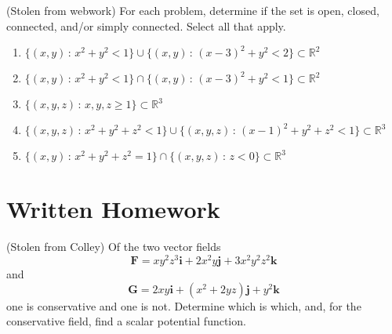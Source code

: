 \documentclass{ximera}
\begin{document}
\begin{problem}
(Stolen from webwork) For each problem, determine if the set is open, closed, connected, and/or simply connected. Select all that apply.
\begin{enumerate}
\item $\{(x,y)\,:\,x^2+y^2<1\}\cup\{(x,y)\,:\,(x-3)^2+y^2<2\}\subset \mathbb{R}^2$
\begin{selectAll}
  \end{selectAll}
\item $\{(x,y)\,:\,x^2+y^2<1\}\cap\{(x,y)\,:\,(x-3)^2+y^2<1\}\subset \mathbb{R}^2$
\begin{selectAll}
  \end{selectAll}
\item $\{(x,y,z)\,:\,x,y,z\geq 1\}\subset \mathbb{R}^3$
\begin{selectAll}
  \end{selectAll}
  \item $\{(x,y,z)\,:\,x^2+y^2+z^2<1\}\cup\{(x,y,z)\,:\,(x-1)^2+y^2+z^2<1\}\subset \mathbb{R}^3$
\begin{selectAll}
  \end{selectAll}
\item $\{(x,y)\,:\,x^2+y^2+z^2=1\}\cap\{(x,y,z)\,:\,z<0\}\subset \mathbb{R}^3$
\begin{selectAll}
  \end{selectAll}
\end{enumerate}
\end{problem}

\section{Written Homework}


\begin{problem}
(Stolen from Colley) Of the two vector fields
\[
\mathbf{F}=xy^2z^3\mathbf{i}+2x^2y\mathbf{j}+3x^2y^2z^2\mathbf{k}
\]
and
\[
\mathbf{G}=2xy\mathbf{i}+(x^2+2yz)\mathbf{j}+y^2\mathbf{k}
\]
one is conservative and one is not. Determine which is which, and, for the conservative field, find a scalar potential function.
\end{problem}
\end{document}
